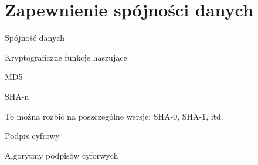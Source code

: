 \section{Zapewnienie spójności danych}

\begin{frame}{Spójność danych}

\end{frame}

\begin{frame}{Kryptograficzne funkcje haszujące}
	
\end{frame}

\begin{frame}{MD5}
	
\end{frame}

\begin{frame}{SHA-n}
	
	To można rozbić na poszczególne wersje: SHA-0, SHA-1, itd.
\end{frame}


\begin{frame}{Podpis cyfrowy}
	
\end{frame}

\begin{frame}{Algorytmy podpisów cyforwych}
	
\end{frame}
